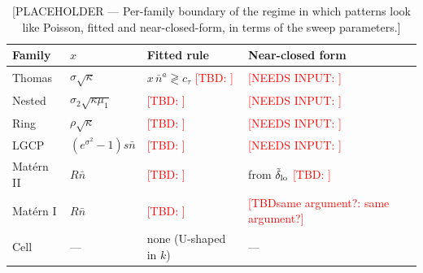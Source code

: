 \documentclass[twoside]{article}
\newcommand{\TBD}[1]{\textcolor{red}{[TBD\ifx\relax#1\relax\else: #1\fi]}}
\newcommand{\NI}[1]{\textcolor{red}{[NEEDS INPUT: #1]}}
\newcommand{\nb}{\bar n}
\begin{document}
\begin{table}[t]
\caption{[PLACEHOLDER — Per-family boundary of the regime in which patterns look like Poisson, fitted and near-closed-form,
in terms of the sweep parameters.]}
\label{tab:boundary}
\begin{center}
\footnotesize
\begin{tabular}{@{}lll l@{}}
\toprule
Family & $x$ & Fitted rule & Near-closed form \\
\midrule
Thomas      & $\sigma\sqrt\kappa$            & $x\,\nb^{a}\gtrless c_\tau$ \TBD{} & \NI{} \\
Nested      & $\sigma_2\sqrt{\kappa\mu_1}$   & \TBD{} & \NI{} \\
Ring        & $\rho\sqrt\kappa$              & \TBD{} & \NI{} \\
LGCP        & $(e^{\sigma^2}-1)s\nb$         & \TBD{} & \NI{} \\
Mat\'ern II & $R\nb$                         & \TBD{} & from $\tilde\delta_{\rm lo}$ \TBD{} \\
Mat\'ern I  & $R\nb$                         & \TBD{} & \TBD{same argument?} \\
Cell        & ---                            & none (U-shaped in $k$) & --- \\
\bottomrule
\end{tabular}
\end{center}
\end{table}
\end{document}

